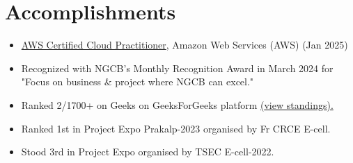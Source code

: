 \documentclass[a4,10pt]{article}
\newenvironment{zitemize}{
\begin{itemize}\itemsep0pt \parskip0pt \parsep1pt}
{\end{itemize}\vspace{-0.5cm}}
\begin{document}
\section{Accomplishments}
\begin{zitemize}
    \item \href{https://www.credly.com/badges/c7ea1aea-cdc3-41c5-8fa0-f3e17866f8ff/public_url}{AWS Certified Cloud Practitioner}, Amazon Web Services (AWS) (Jan 2025)
    \item Recognized with NGCB's Monthly Recognition Award in March 2024 for "Focus on business \& project where NGCB can excel."
    \item Ranked 2/1700+ on Geeks on GeeksForGeeks platform 
    \href{https://auth.geeksforgeeks.org/college/thadomal-shahani-engineering-college-tsec-mumbai/}{({view standings}).}
    \item Ranked 1st in Project Expo Prakalp-2023 organised by Fr CRCE E-cell.
    \item Stood 3rd in Project Expo organised by TSEC E-cell-2022.
    \end{zitemize}

\end{document}
